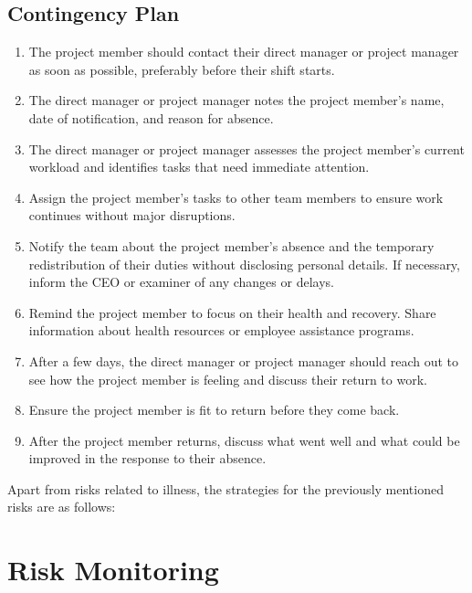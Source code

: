 \subsection{Contingency Plan}
\label{sec:contingency}
\begin{enumerate}[label=\textbf{\arabic*.}]
    \item The project member should contact their direct manager or project manager as soon as possible, preferably before their shift starts.  

    \item The direct manager or project manager notes the project member's name, date of notification, and reason for absence.  

    \item The direct manager or project manager assesses the project member’s current workload and identifies tasks that need immediate attention.  

    \item Assign the project member's tasks to other team members to ensure work continues without major disruptions.  

    \item Notify the team about the project member’s absence and the temporary redistribution of their duties without disclosing personal details. If necessary, inform the CEO or examiner of any changes or delays.  

    \item Remind the project member to focus on their health and recovery. Share information about health resources or employee assistance programs.  

    \item After a few days, the direct manager or project manager should reach out to see how the project member is feeling and discuss their return to work.  

    \item Ensure the project member is fit to return before they come back. 

    \item After the project member returns, discuss what went well and what could be improved in the response to their absence.  
\end{enumerate}

Apart from risks related to illness, the strategies for the previously mentioned risks are as follows:

\newpage
\section{Risk Monitoring}

